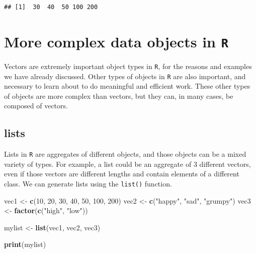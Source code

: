 \documentclass[]{book}
\newenvironment{Shaded}{\begin{snugshade}}{\end{snugshade}}
\newcommand{\DecValTok}[1]{\textcolor[rgb]{0.00,0.00,0.81}{#1}}
\newcommand{\KeywordTok}[1]{\textcolor[rgb]{0.13,0.29,0.53}{\textbf{#1}}}
\newcommand{\NormalTok}[1]{#1}
\newcommand{\StringTok}[1]{\textcolor[rgb]{0.31,0.60,0.02}{#1}}
\begin{document}
\begin{verbatim}
## [1]  30  40  50 100 200
\end{verbatim}

\hypertarget{more-complex-data-objects-in-r}{%
\section{\texorpdfstring{More complex data objects in \texttt{R}}{More complex data objects in R}}\label{more-complex-data-objects-in-r}}

Vectors are extremely important object types in \texttt{R}, for the reasons and examples we have already discussed. Other types of objects in \texttt{R} are also important, and necessary to learn about to do meaningful and efficient work. These other types of objects are more complex than vectors, but they can, in many cases, be composed of vectors.

\hypertarget{lists}{%
\subsection{lists}\label{lists}}

Lists in \texttt{R} are aggregates of different objects, and those objects can be a mixed variety of types. For example, a list could be an aggregate of 3 different vectors, even if those vectors are different lengths and contain elements of a different class. We can generate lists using the \texttt{list()} function.

\begin{Shaded}
\begin{Highlighting}[]
\NormalTok{vec1 <-}\StringTok{ }\KeywordTok{c}\NormalTok{(}\DecValTok{10}\NormalTok{, }\DecValTok{20}\NormalTok{, }\DecValTok{30}\NormalTok{, }\DecValTok{40}\NormalTok{, }\DecValTok{50}\NormalTok{, }\DecValTok{100}\NormalTok{, }\DecValTok{200}\NormalTok{)}
\NormalTok{vec2 <-}\StringTok{ }\KeywordTok{c}\NormalTok{(}\StringTok{"happy"}\NormalTok{, }\StringTok{"sad"}\NormalTok{, }\StringTok{"grumpy"}\NormalTok{)}
\NormalTok{vec3 <-}\StringTok{ }\KeywordTok{factor}\NormalTok{(}\KeywordTok{c}\NormalTok{(}\StringTok{"high"}\NormalTok{, }\StringTok{"low"}\NormalTok{))}

\NormalTok{mylist <-}\StringTok{ }\KeywordTok{list}\NormalTok{(vec1, vec2, vec3)}

\KeywordTok{print}\NormalTok{(mylist)}
\end{Highlighting}
\end{Shaded}
\end{document}
